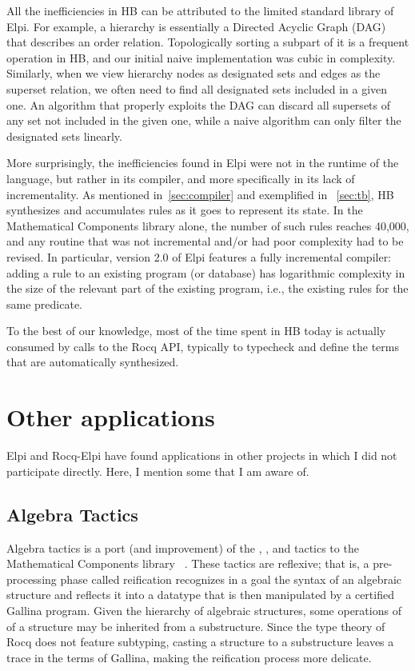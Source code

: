 \documentclass{these-ISSS}
\begin{document}
All the inefficiencies in HB can be attributed to the limited standard library
of Elpi. For example, a hierarchy is essentially a Directed Acyclic Graph
(DAG) that describes an order relation. Topologically sorting a subpart of it
is a frequent operation in HB, and our initial naive implementation was cubic
in complexity. Similarly, when we view hierarchy nodes as designated sets and
edges as the superset relation, we often need to find all designated sets
included in a given one. An algorithm that properly exploits the DAG can
discard all supersets of any set not included in the given one, while a naive
algorithm can only filter the designated sets linearly.

More surprisingly, the inefficiencies found in Elpi were not in the runtime of
the language, but rather in its compiler, and more specifically in its lack of
incrementality. As mentioned in~\cref{sec:compiler} and exemplified in
~\cref{sec:tb}, HB synthesizes and accumulates rules as it goes to represent
its state. In the Mathematical Components library alone, the number of such
rules reaches 40,000, and any routine that was not incremental and/or had poor
complexity had to be revised. In particular, version 2.0 of Elpi features a
fully incremental compiler: adding a rule to an existing program (or database)
has logarithmic complexity in the size of the relevant part of the existing
program, i.e., the existing rules for the same predicate.

To the best of our knowledge, most of the time spent in HB today is actually
consumed by calls to the Rocq API, typically to typecheck and define the terms
that are automatically synthesized.

\newpage\section{Other applications}


Elpi and Rocq-Elpi have found applications in other projects in which I did not
participate directly. Here, I mention some that I am aware of.

\subsection{Algebra Tactics}

Algebra tactics is a port (and improvement) of the , ,
and  tactics to the Mathematical Components library
~\cite{sakaguchi:LIPIcs.ITP.2022.29}. These tactics are reflexive; that is, a
pre-processing phase called reification recognizes in a goal the syntax of an
algebraic structure and reflects it into a datatype that is then manipulated by
a certified Gallina program. Given the hierarchy of algebraic structures, some operations
of of a structure may be inherited from a substructure. Since the type
theory of Rocq does not feature subtyping, casting a structure to a
substructure leaves a trace in the terms of Gallina, making the reification
process more delicate.
\end{document}
